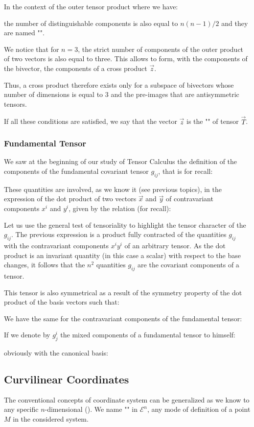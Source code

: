 	In the context of the outer tensor product where we have:
	
	the number of distinguishable components is also equal to $n(n-1)/2$ and they are named "".
	
	We notice that for $n=3$, the strict number of components of the outer product of two vectors is also equal to three. This allows to form, with the components of the bivector, the components of a cross product $\vec{z}$.

	Thus, a cross product therefore exists only for a subspace of bivectors whose number of dimensions is equal to $3$ and the pre-images that are antisymmetric tensors.

	If all these conditions are satisfied, we say that the vector 
$\vec{z}$ is the "" of tensor $\vec{T}$.

	\subsubsection{Fundamental Tensor}
	We saw at the beginning of our study of Tensor Calculus the definition of the components of the fundamental covariant tensor $g_{ij}$, that is for recall:
	
	These quantities are involved, as we know it (see previous topics), in the expression of the dot product of two vectors $\vec{x}$ and $\vec{y}$ of contravariant components $x^i$ and $y^i$, given by the relation (for recall):
	
	Let us use the general test of tensoriality to highlight the tensor character of the $g_{ij}$. The previous expression is a product fully contracted of the quantities $g_{ij}$ with the contravariant components  $x^iy^i$ of an arbitrary tensor. As the dot product is an invariant quantity (in this case a scalar) with respect to the base changes, it follows that the $n^2$ quantities $g_{ij}$ are the covariant components of a tensor.

	This tensor is also symmetrical as a result of the symmetry property of the dot product of the basis vectors such that:
	
	We have the same for the contravariant components of the fundamental tensor:
	
	If we denote by $g_j^i$ the mixed components of a fundamental tensor to himself:
	
	obviously with the canonical basis:	
	
	
	\subsection{Curvilinear Coordinates}
	The conventional concepts of coordinate system can be generalized as we know to any specific $n$-dimensional (). We name "" in $\mathcal{E}^n$, any mode of definition of a point $M$ in the considered system.
	
